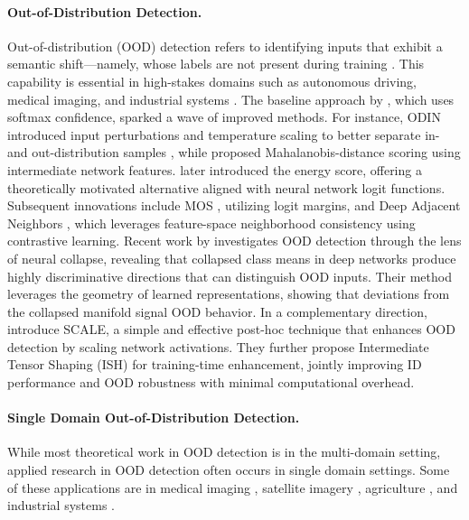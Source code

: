 \documentclass[letterpaper]{article} %
\theoremstyle{plain}
\theoremstyle{definition}
\theoremstyle{remark}
\begin{document}
\paragraph{Out-of-Distribution Detection.} 
Out-of-distribution (OOD) detection refers to identifying inputs that exhibit a semantic shift—namely, whose labels are not present during training \citep{yang2021generalized}. This capability is essential in high-stakes domains such as autonomous driving, medical imaging, and industrial systems \citep{huang2020survey}. The baseline approach by \citet{hendrycks2016baseline}, which uses softmax confidence, sparked a wave of improved methods. For instance, ODIN introduced input perturbations and temperature scaling to better separate in- and out-distribution samples \citep{liang2017enhancing}, while \citet{lee2018simple} proposed Mahalanobis-distance scoring using intermediate network features. \citet{liu2020energy} later introduced the energy score, offering a theoretically motivated alternative aligned with neural network logit functions. Subsequent innovations include MOS \citep{huang2021mos}, utilizing logit margins, and Deep Adjacent Neighbors \citep{sun2022out}, which leverages feature-space neighborhood consistency using contrastive learning. Recent work by \citet{liu2025detecting} investigates OOD detection through the lens of neural collapse, revealing that collapsed class means in deep networks produce highly discriminative directions that can distinguish OOD inputs. Their method leverages the geometry of learned representations, showing that deviations from the collapsed manifold signal OOD behavior. In a complementary direction, \citet{xu2023scaling} introduce \textsc{SCALE}, a simple and effective post-hoc technique that enhances OOD detection by scaling network activations. They further propose Intermediate Tensor Shaping (ISH) for training-time enhancement, jointly improving ID performance and OOD robustness with minimal computational overhead.


\paragraph{Single Domain Out-of-Distribution Detection.} 
While most theoretical work in OOD detection is in the multi-domain setting, applied research in OOD detection often occurs in single domain settings. Some of these applications are in medical imaging \citep{narayanaswamy2023exploring, zhang2021out, cao2020benchmark}, satellite imagery \citep{le2024detecting, gawlikowski2021out}, agriculture \citep{saadati2024out, li2023mlfanet}, and industrial systems \citep{kim2021wafer, kafunah2023out}.
\end{document}
